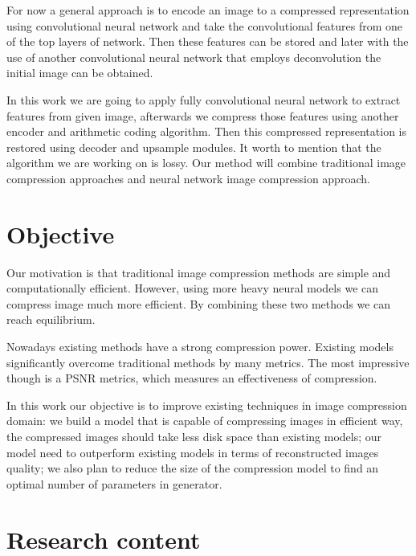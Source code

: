 For now a general approach is to encode an image to a compressed representation using convolutional neural network and take the convolutional features from one of the top layers of network. Then these features can be stored and later with the use of another convolutional neural network that employs deconvolution the initial image can be obtained.

In this work we are going to apply fully convolutional neural network to extract features from given image, afterwards we compress those features using another encoder and arithmetic coding algorithm. Then this compressed representation is restored using decoder and upsample modules. It worth to mention that the algorithm we are working on is lossy. Our method will combine traditional image compression approaches and neural network image compression approach.

\section{Objective}

Our motivation is that traditional image compression methods are simple and computationally efficient. However, using more heavy neural models we can compress image much more efficient. By combining these two methods we can reach equilibrium.

Nowadays existing methods have a strong compression power. Existing models significantly overcome traditional methods by many metrics. The most impressive though is a PSNR metrics, which measures an effectiveness of compression.

In this work our objective is to improve existing techniques in image compression domain: we build a model that is capable of compressing images in efficient way, the compressed images should take less disk space than existing models; our model need to outperform existing models in terms of reconstructed images quality; we also plan to reduce the size of the compression model to find an optimal number of parameters in generator.

\section{Research content}

